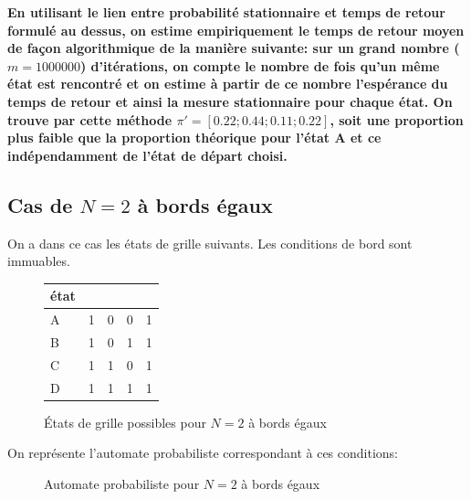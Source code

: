 \documentclass[11pt,a4paper]{article}
\begin{document}
{\bfseries
En utilisant le lien entre probabilité stationnaire et temps de retour
formulé au dessus, on estime empiriquement le temps de retour moyen de
façon algorithmique de la manière suivante: sur un grand nombre ($m =
1000000$) d'itérations, on compte le nombre de fois qu'un même état
est rencontré et on estime à partir de ce nombre l'espérance du temps
de retour et ainsi la mesure stationnaire pour chaque état.
On trouve par cette méthode $\pi' = [0.22; 0.44; 0.11; 0.22]$, soit
une proportion plus faible que la proportion théorique pour l'état A
et ce indépendamment de l'état de départ choisi.
}

\subsection{Cas de $N = 2$ à bords égaux}

On a dans ce cas les états de grille suivants. Les conditions de bord
sont immuables.

\begin{figure}[h]
  \begin{center}
    \begin{tabular}{l | c | c c | c}
      état \\
      \hline
      A & 1 & 0 & 0 & 1 \\
      B & 1 & 0 & 1 & 1 \\
      C & 1 & 1 & 0 & 1 \\
      D & 1 & 1 & 1 & 1 \\
    \end{tabular}
  \end{center}
  \caption{États de grille possibles pour $N = 2$ à bords égaux}
\end{figure}

On représente l'automate probabiliste correspondant à ces conditions:

\begin{figure}[H]
  \begin{center}
  \end{center}
  \caption{Automate probabiliste pour $N = 2$ à bords égaux}
\end{figure}
\end{document}
